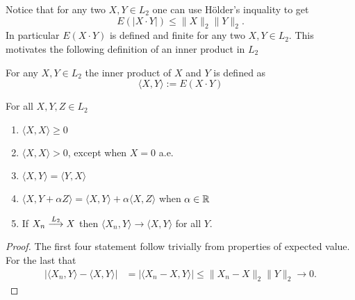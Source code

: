 Notice that for any two $X, Y \in L_2$ one can use H\"older's inquality  to get
\begin{equation}
\label{cw}
 E(|X\cdot Y|) \leq \| X\|_2 \|Y\|_2. 
 \end{equation}
In particular $E(X\cdot Y)$ is defined and finite for any two $X, Y \in L_2$. This motivates the following definition of an inner product in $L_2$

\begin{definition}
For any $X, Y \in L_2$ the inner product of $X$ and $Y$ is defined as
\begin{equation}
\label{inner product def} 
\langle X, Y\rangle := E(X\cdot Y) 
\end{equation}
\end{definition}

\begin{theorem}
\label{basic inner product properties}
For all $X, Y, Z\in L_2$
\begin{enumerate}
\item $\langle X,X\rangle \geq 0$
\item $\langle X,X\rangle > 0$, except when $X = 0$ a.e.
\item $\langle X,Y\rangle= \langle Y,X\rangle $
\item $\langle X, Y + \alpha Z \rangle= \langle X, Y \rangle + \alpha\langle X, Z \rangle$ when $\alpha\in \Bbb R$
\item \label{weak limits} If $X_n \overset{\small L_2} \longrightarrow X$ then $\langle X_n, Y \rangle \rightarrow \langle X, Y\rangle$ for all $Y$.
\end{enumerate}
\end{theorem}
\begin{proof} The first four statement follow trivially from properties of expected value. For the last that 
\begin{align*} 
|\langle X_n, Y\rangle - \langle X,Y\rangle| &= |\langle X_n - X, Y\rangle|
\leq \| X_n - X\|_2 \|Y\|_2 \rightarrow 0.
\end{align*}
\end{proof}


